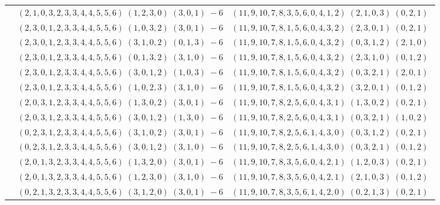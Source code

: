 \documentclass[11pt]{article}
\begin{document}
\begin{longtable}[l]{|c|c|c|}
 \cline{2-3} 
 & $(2 ,1 ,0 ,3 ,2 ,3 ,3 ,4 ,4 ,5 ,5 ,6) \;(1 ,2 ,3 ,0) \;(3 ,0 ,1) \;-6$ & $(11 ,9 ,10 ,7 ,8 ,3 ,5 ,6 ,0 ,4 ,1 ,2) \;(2 ,1 ,0 ,3) \;(0 ,2 ,1) \;$\\ 
 \cline{2-3} 
 & $(2 ,3 ,0 ,1 ,2 ,3 ,3 ,4 ,4 ,5 ,5 ,6) \;(1 ,0 ,3 ,2) \;(3 ,0 ,1) \;-6$ & $(11 ,9 ,10 ,7 ,8 ,1 ,5 ,6 ,0 ,4 ,3 ,2) \;(2 ,3 ,0 ,1) \;(0 ,2 ,1) \;$\\ 
 \cline{2-3} 
 & $(2 ,3 ,0 ,1 ,2 ,3 ,3 ,4 ,4 ,5 ,5 ,6) \;(3 ,1 ,0 ,2) \;(0 ,1 ,3) \;-6$ & $(11 ,9 ,10 ,7 ,8 ,1 ,5 ,6 ,0 ,4 ,3 ,2) \;(0 ,3 ,1 ,2) \;(2 ,1 ,0) \;$\\ 
 \cline{2-3} 
 & $(2 ,3 ,0 ,1 ,2 ,3 ,3 ,4 ,4 ,5 ,5 ,6) \;(0 ,1 ,3 ,2) \;(3 ,1 ,0) \;-6$ & $(11 ,9 ,10 ,7 ,8 ,1 ,5 ,6 ,0 ,4 ,3 ,2) \;(2 ,3 ,1 ,0) \;(0 ,1 ,2) \;$\\ 
 \cline{2-3} 
 & $(2 ,3 ,0 ,1 ,2 ,3 ,3 ,4 ,4 ,5 ,5 ,6) \;(3 ,0 ,1 ,2) \;(1 ,0 ,3) \;-6$ & $(11 ,9 ,10 ,7 ,8 ,1 ,5 ,6 ,0 ,4 ,3 ,2) \;(0 ,3 ,2 ,1) \;(2 ,0 ,1) \;$\\ 
 \cline{2-3} 
 & $(2 ,3 ,0 ,1 ,2 ,3 ,3 ,4 ,4 ,5 ,5 ,6) \;(1 ,0 ,2 ,3) \;(3 ,1 ,0) \;-6$ & $(11 ,9 ,10 ,7 ,8 ,1 ,5 ,6 ,0 ,4 ,3 ,2) \;(3 ,2 ,0 ,1) \;(0 ,1 ,2) \;$\\ 
 \cline{2-3} 
 & $(2 ,0 ,3 ,1 ,2 ,3 ,3 ,4 ,4 ,5 ,5 ,6) \;(1 ,3 ,0 ,2) \;(3 ,0 ,1) \;-6$ & $(11 ,9 ,10 ,7 ,8 ,2 ,5 ,6 ,0 ,4 ,3 ,1) \;(1 ,3 ,0 ,2) \;(0 ,2 ,1) \;$\\ 
 \cline{2-3} 
 & $(2 ,0 ,3 ,1 ,2 ,3 ,3 ,4 ,4 ,5 ,5 ,6) \;(3 ,0 ,1 ,2) \;(1 ,3 ,0) \;-6$ & $(11 ,9 ,10 ,7 ,8 ,2 ,5 ,6 ,0 ,4 ,3 ,1) \;(0 ,3 ,2 ,1) \;(1 ,0 ,2) \;$\\ 
 \cline{2-3} 
 & $(0 ,2 ,3 ,1 ,2 ,3 ,3 ,4 ,4 ,5 ,5 ,6) \;(3 ,1 ,0 ,2) \;(3 ,0 ,1) \;-6$ & $(11 ,9 ,10 ,7 ,8 ,2 ,5 ,6 ,1 ,4 ,3 ,0) \;(0 ,3 ,1 ,2) \;(0 ,2 ,1) \;$\\ 
 \cline{2-3} 
 & $(0 ,2 ,3 ,1 ,2 ,3 ,3 ,4 ,4 ,5 ,5 ,6) \;(3 ,0 ,1 ,2) \;(3 ,1 ,0) \;-6$ & $(11 ,9 ,10 ,7 ,8 ,2 ,5 ,6 ,1 ,4 ,3 ,0) \;(0 ,3 ,2 ,1) \;(0 ,1 ,2) \;$\\ 
 \cline{2-3} 
 & $(2 ,0 ,1 ,3 ,2 ,3 ,3 ,4 ,4 ,5 ,5 ,6) \;(1 ,3 ,2 ,0) \;(3 ,0 ,1) \;-6$ & $(11 ,9 ,10 ,7 ,8 ,3 ,5 ,6 ,0 ,4 ,2 ,1) \;(1 ,2 ,0 ,3) \;(0 ,2 ,1) \;$\\ 
 \cline{2-3} 
 & $(2 ,0 ,1 ,3 ,2 ,3 ,3 ,4 ,4 ,5 ,5 ,6) \;(1 ,2 ,3 ,0) \;(3 ,1 ,0) \;-6$ & $(11 ,9 ,10 ,7 ,8 ,3 ,5 ,6 ,0 ,4 ,2 ,1) \;(2 ,1 ,0 ,3) \;(0 ,1 ,2) \;$\\ 
 \cline{2-3} 
 & $(0 ,2 ,1 ,3 ,2 ,3 ,3 ,4 ,4 ,5 ,5 ,6) \;(3 ,1 ,2 ,0) \;(3 ,0 ,1) \;-6$ & $(11 ,9 ,10 ,7 ,8 ,3 ,5 ,6 ,1 ,4 ,2 ,0) \;(0 ,2 ,1 ,3) \;(0 ,2 ,1) \;$\\ 

\end{longtable}
\end{document}
